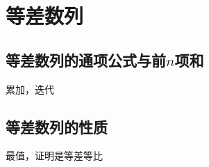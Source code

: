 
\section{等差数列}
\subsection{等差数列的通项公式与前\texorpdfstring{$n$}n项和}
累加，迭代
\clearpage

\subsection{等差数列的性质}
最值，证明是等差等比
\clearpage
